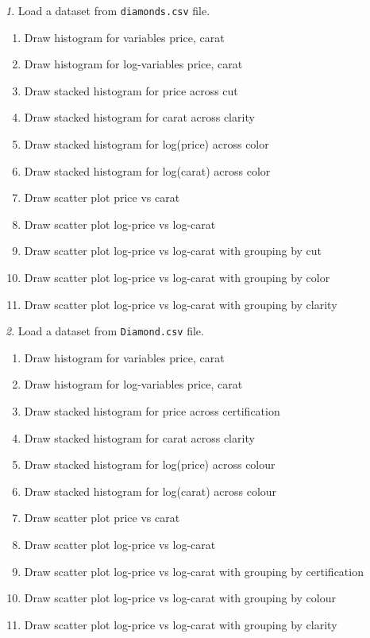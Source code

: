 \documentclass[12pt]{article}
\theoremstyle{remark}
\newtheorem{problem}{}[section]
\begin{document}
\begin{problem}
Load a dataset from \texttt{diamonds.csv} file.
\begin{enumerate}
	\item Draw histogram for variables price, carat
	\item Draw histogram for log-variables price, carat
	\item Draw stacked histogram for price across cut
	\item Draw stacked histogram for carat across clarity 
	\item Draw stacked histogram for log(price) across color
	\item Draw stacked histogram for log(carat) across color
	\item Draw scatter plot price vs carat
	\item Draw scatter plot log-price vs log-carat
	\item Draw scatter plot log-price vs log-carat with grouping by cut
	\item Draw scatter plot log-price vs log-carat with grouping by color
	\item Draw scatter plot log-price vs log-carat with grouping by clarity
\end{enumerate}
\end{problem}

\begin{problem}
Load a dataset from \texttt{Diamond.csv} file.
\begin{enumerate}
	\item Draw histogram for variables price, carat
	\item Draw histogram for log-variables price, carat
	\item Draw stacked histogram for price across certification
	\item Draw stacked histogram for carat across clarity 
	\item Draw stacked histogram for log(price) across colour
	\item Draw stacked histogram for log(carat) across colour
	\item Draw scatter plot price vs carat
	\item Draw scatter plot log-price vs log-carat
	\item Draw scatter plot log-price vs log-carat with grouping by certification
	\item Draw scatter plot log-price vs log-carat with grouping by colour
	\item Draw scatter plot log-price vs log-carat with grouping by clarity
\end{enumerate}
\end{problem}
\end{document}
